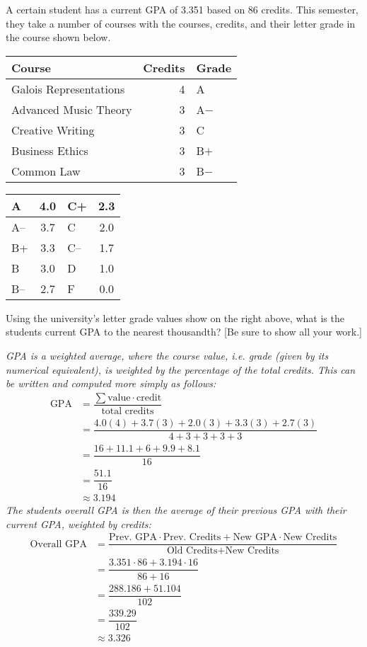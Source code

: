 \documentclass[12pt,letterpaper]{exam}
\begin{document}
\begin{questions}
\newpage
\question[10] A certain student has a current GPA of 3.351 based on 86 credits. This semester, they take a number of courses with the courses, credits, and their letter grade in the course shown below. \par
	\begin{table}[!ht]
	\centering
	\begin{tabular}{lrl}
	Course & Credits & Grade \\ \hline
	Galois Representations & 4 & A \\
	Advanced Music Theory & 3 & A$-$ \\
	Creative Writing & 3 & C \\
	Business Ethics & 3 & B$+$ \\
	Common Law & 3 & B$-$
	\end{tabular} \hspace{1cm}
        \begin{tabular}{|l||c|l||c|} \hline
        A & 4.0 & C+ & 2.3 \\ \hline
        A-- & 3.7 & C & 2.0 \\ \hline
        B+ & 3.3 & C-- & 1.7 \\ \hline
        B & 3.0 & D & 1.0 \\ \hline
        B-- & 2.7 & F & 0.0 \\ \hline
        \end{tabular}
	\end{table} \par
Using the university's letter grade values show on the right above, what is the students current GPA to the nearest thousandth? [Be sure to show all your work.] \pspace

{\itshape
\sol GPA is a weighted average, where the course value, i.e. grade (given by its numerical equivalent), is weighted by the percentage of the total credits. This can be written and computed more simply as follows:
	\[
	\begin{aligned}
	\text{GPA}&= \dfrac{\sum \text{value} \cdot \text{credit}}{\text{total credits}} \\[0.3cm]
	&= \dfrac{4.0(4) + 3.7(3) + 2.0(3) + 3.3(3) + 2.7(3)}{4 + 3 + 3 + 3 + 3} \\[0.3cm]
	&= \dfrac{16 + 11.1 + 6 + 9.9 + 8.1}{16} \\[0.3cm]
	&= \dfrac{51.1}{16} \\[0.3cm]
	&\approx 3.194
	\end{aligned}
	\] 
The students overall GPA is then the average of their previous GPA with their current GPA, weighted by credits: 
	\[
	\begin{aligned}
	\text{Overall GPA}&= \dfrac{\text{Prev. GPA} \cdot \text{Prev. Credits} + \text{New GPA} \cdot \text{New Credits}}{\text{Old Credits} + \text{New Credits}} \\[0.3cm]
	&= \dfrac{3.351 \cdot 86 + 3.194 \cdot 16}{86 + 16} \\[0.3cm]
	&= \dfrac{288.186 + 51.104}{102} \\[0.3cm]
	&= \dfrac{339.29}{102} \\[0.3cm]
	&\approx 3.326
	\end{aligned}
	\]
}




\end{questions}
\end{document}
